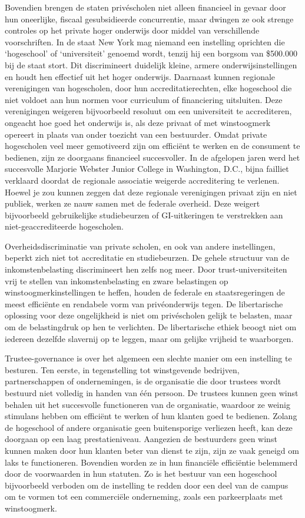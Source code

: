 \documentclass[
  a5paper,
  smalldemyvopaper,10pt,twoside,onecolumn,openright,extrafontsizes,hidelinks]{memoir}
\begin{document}
Bovendien brengen de staten privéscholen niet alleen financieel in
gevaar door hun oneerlijke, fiscaal gesubsidieerde concurrentie, maar
dwingen ze ook strenge controles op het private hoger onderwijs door
middel van verschillende voorschriften. In de staat New York mag niemand
een instelling oprichten die `hogeschool' of `universiteit' genoemd
wordt, tenzij hij een borgsom van \$500.000 bij de staat stort. Dit
discrimineert duidelijk kleine, armere onderwijsinstellingen en houdt
hen effectief uit het hoger onderwijs. Daarnaast kunnen regionale
verenigingen van hogescholen, door hun accreditatierechten, elke
hogeschool die niet voldoet aan hun normen voor curriculum of
financiering uitsluiten. Deze verenigingen weigeren bijvoorbeeld
resoluut om een universiteit te accrediteren, ongeacht hoe goed het
onderwijs is, als deze privaat of met winstoogmerk opereert in plaats
van onder toezicht van een bestuurder. Omdat private hogescholen veel
meer gemotiveerd zijn om efficiënt te werken en de consument te
bedienen, zijn ze doorgaans financieel succesvoller. In de afgelopen
jaren werd het succesvolle Marjorie Webster Junior College in
Washington, D.C., bijna failliet verklaard doordat de regionale
associatie weigerde accreditering te verlenen. Hoewel je zou kunnen
zeggen dat deze regionale verenigingen privaat zijn en niet publiek,
werken ze nauw samen met de federale overheid. Deze weigert bijvoorbeeld
gebruikelijke studiebeurzen of GI-uitkeringen te verstrekken aan
niet-geaccrediteerde hogescholen.

Overheidsdiscriminatie van private scholen, en ook van andere
instellingen, beperkt zich niet tot accreditatie en studiebeurzen. De
gehele structuur van de inkomstenbelasting discrimineert hen zelfs nog
meer. Door trust-universiteiten vrij te stellen van inkomstenbelasting
en zware belastingen op winstoogmerkinstellingen te heffen, houden de
federale en staatsregeringen de meest efficiënte en rendabele vorm van
privéonderwijs tegen. De libertarische oplossing voor deze ongelijkheid
is niet om privéscholen gelijk te belasten, maar om de belastingdruk op
hen te verlichten. De libertarische ethiek beoogt niet om iedereen
dezelfde slavernij op te leggen, maar om gelijke vrijheid te waarborgen.

Trustee-governance is over het algemeen een slechte manier om een
instelling te besturen. Ten eerste, in tegenstelling tot winstgevende
bedrijven, partnerschappen of ondernemingen, is de organisatie die door
trustees wordt bestuurd niet volledig in handen van één persoon. De
trustees kunnen geen winst behalen uit het succesvolle functioneren van
de organisatie, waardoor ze weinig stimulans hebben om efficiënt te
werken of hun klanten goed te bedienen. Zolang de hogeschool of andere
organisatie geen buitensporige verliezen heeft, kan deze doorgaan op een
laag prestatieniveau. Aangezien de bestuurders geen winst kunnen maken
door hun klanten beter van dienst te zijn, zijn ze vaak geneigd om laks
te functioneren. Bovendien worden ze in hun financiële efficiëntie
belemmerd door de voorwaarden in hun statuten. Zo is het bestuur van een
hogeschool bijvoorbeeld verboden om de instelling te redden door een
deel van de campus om te vormen tot een commerciële onderneming, zoals
een parkeerplaats met winstoogmerk.
\end{document}
